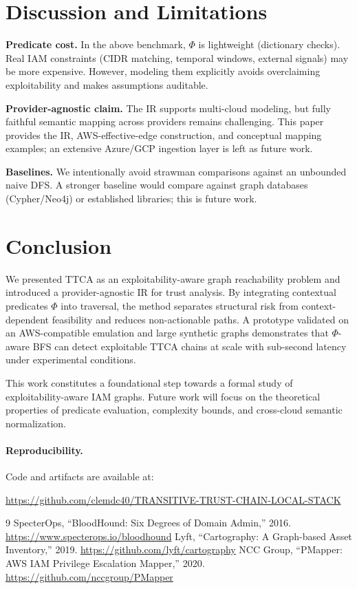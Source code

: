\documentclass[a4paper,11pt]{article}
\begin{document}
\section{Discussion and Limitations}
\textbf{Predicate cost.} In the above benchmark, \(\Phi\) is lightweight (dictionary checks). Real IAM constraints (CIDR matching, temporal windows, external signals) may be more expensive. However, modeling them explicitly avoids overclaiming exploitability and makes assumptions auditable.

\textbf{Provider-agnostic claim.} The IR supports multi-cloud modeling, but fully faithful semantic mapping across providers remains challenging. This paper provides the IR, AWS-effective-edge construction, and conceptual mapping examples; an extensive Azure/GCP ingestion layer is left as future work.

\textbf{Baselines.} We intentionally avoid strawman comparisons against an unbounded naive DFS. A stronger baseline would compare against graph databases (Cypher/Neo4j) or established libraries; this is future work.

\section{Conclusion}
We presented TTCA as an exploitability-aware graph reachability problem and introduced a provider-agnostic IR for trust analysis. By integrating contextual predicates \(\Phi\) into traversal, the method separates structural risk from context-dependent feasibility and reduces non-actionable paths. A prototype validated on an AWS-compatible emulation and large synthetic graphs demonstrates that \(\Phi\)-aware BFS can detect exploitable TTCA chains at scale with sub-second latency under experimental conditions.

This work constitutes a foundational step towards a formal study of exploitability-aware IAM graphs. Future work will focus on the theoretical properties of predicate evaluation, complexity bounds, and cross-cloud semantic normalization.

\paragraph{Reproducibility.}
Code and artifacts are available at:

\url{https://github.com/clemdc40/TRANSITIVE-TRUST-CHAIN-LOCAL-STACK}

\newpage
\begin{thebibliography}{9}
 SpecterOps, ``BloodHound: Six Degrees of Domain Admin,'' 2016. \url{https://www.specterops.io/bloodhound}
 Lyft, ``Cartography: A Graph-based Asset Inventory,'' 2019. \url{https://github.com/lyft/cartography}
 NCC Group, ``PMapper: AWS IAM Privilege Escalation Mapper,'' 2020. \url{https://github.com/nccgroup/PMapper}
\end{thebibliography}
\end{document}
